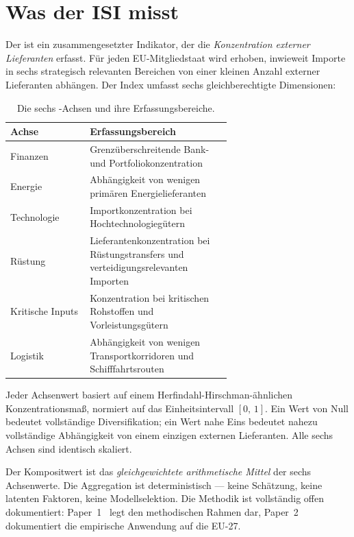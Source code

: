 \section{Was der ISI misst}
\label{sec:was-der-isi-misst}

Der \ISI ist ein zusammengesetzter Indikator, der die
\emph{Konzentration externer Lieferanten} erfasst.  F\"ur jeden
EU-Mitgliedstaat wird erhoben, inwieweit Importe in sechs strategisch
relevanten Bereichen von einer kleinen Anzahl externer Lieferanten
abh\"angen.  Der Index umfasst sechs gleichberechtigte Dimensionen:

\begin{table}[htbp]
\centering\small
\caption{Die sechs \ISI-Achsen und ihre Erfassungs\-bereiche.}
\label{tab:achsen}
\begin{tabular}{@{}lp{0.64\linewidth}@{}}
\toprule
\textbf{Achse} & \textbf{Erfassungsbereich} \\
\midrule
Finanzen &
  Grenz\"uber\-schreitende Bank- und
  Portfolio\-konzentration \\
Energie &
  Abh\"angigkeit von wenigen prim\"aren
  Energie\-lieferanten \\
Technologie &
  Import\-konzentration bei
  Hochtechnologie\-g\"utern \\
R\"ustung &
  Lieferanten\-konzentration bei R\"ustungs\-transfers und
  verteidigungs\-relevanten Importen \\
Kritische Inputs &
  Konzentration bei kritischen Rohstoffen und
  Vorleistungs\-g\"utern \\
Logistik &
  Abh\"angigkeit von wenigen Transport\-korridoren und
  Schifffahrts\-routen \\
\bottomrule
\end{tabular}
\end{table}

\begin{sloppypar}
Jeder Achsenwert basiert auf einem Herfindahl-Hirschman-\"ahnlichen
Konzentrations\-ma\ss, normiert auf das Einheits\-intervall
$[0,\,1]$.  Ein Wert von Null bedeutet vollst\"andige
Diversifikation; ein Wert nahe Eins bedeutet nahezu vollst\"andige
Abh\"angigkeit von einem einzigen externen Lieferanten.  Alle sechs
Achsen sind identisch skaliert.
\end{sloppypar}

\begin{sloppypar}
Der Kompositwert ist das \emph{gleichgewichtete arithmetische
Mittel} der sechs Achsenwerte.  Die Aggregation ist
deterministisch --- keine Sch\"atzung, keine latenten Faktoren,
keine Modell\-selektion.  Die Methodik ist vollst\"andig offen
dokumentiert: Paper~1~\cite{isi_paper1} legt den methodischen
Rahmen dar, Paper~2~\cite{isi_paper2} dokumentiert die empirische
Anwendung auf die EU-27.
\end{sloppypar}

